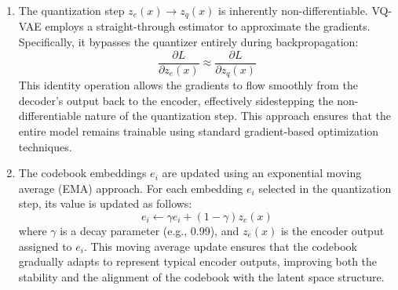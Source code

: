 \documentclass{article}
\begin{document}
\begin{enumerate}
    \item 
    The quantization step \( z_e(x) \rightarrow z_q(x) \) is inherently non-differentiable. VQ-VAE employs a straight-through estimator to approximate the gradients. Specifically, it bypasses the quantizer entirely during backpropagation: 
    \[ \frac{\partial L}{\partial z_e(x)} \approx \frac{\partial L}{\partial z_q(x)} \]
    This identity operation allows the gradients to flow smoothly from the decoder’s output back to the encoder, effectively sidestepping the non-differentiable nature of the quantization step. This approach ensures that the entire model remains trainable using standard gradient-based optimization techniques.
    \item 
    The codebook embeddings \( e_i \) are updated using an exponential moving average (EMA) approach. For each embedding \( e_i \) selected in the quantization step, its value is updated as follows:
    \[ e_i \leftarrow \gamma e_i + (1 - \gamma) z_e(x) \]
    where \( \gamma \) is a decay parameter (e.g., 0.99), and \( z_e(x) \) is the encoder output assigned to \( e_i \).
    This moving average update ensures that the codebook gradually adapts to represent typical encoder outputs, improving both the stability and the alignment of the codebook with the latent space structure.

\end{enumerate}

\end{document}
